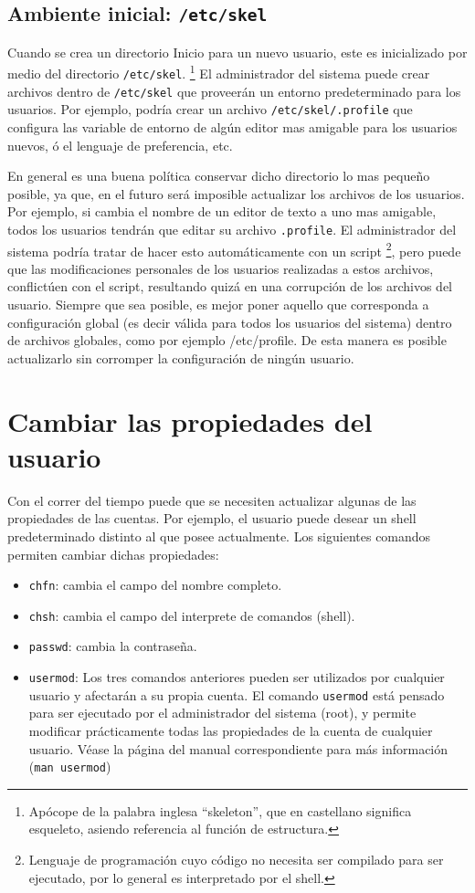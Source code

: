 \documentclass[12pt]{article}
\begin{document}
\subsection*{Ambiente inicial: \texttt{/etc/skel}}
Cuando se crea un directorio Inicio para un nuevo usuario, este es
inicializado por medio del directorio \texttt{/etc/skel}. 
\footnote{Apócope de la palabra inglesa ``skeleton'', que en castellano 
significa esqueleto, asiendo referencia al función de estructura.} El
administrador del sistema puede crear archivos dentro de
\texttt{/etc/skel} que proveerán un entorno predeterminado
para los usuarios. Por ejemplo, podría crear un archivo 
\texttt{/etc/skel/.profile} que configura las variable de entorno
de algún editor mas amigable para los usuarios nuevos, ó el lenguaje 
de preferencia, etc. 

En general es una buena política conservar dicho directorio lo mas pequeño
posible, ya que, en el futuro será imposible actualizar los archivos de
los usuarios. Por ejemplo, si cambia el nombre de un editor de texto a uno mas amigable,
todos los usuarios tendrán que editar su archivo  \texttt{.profile}.
El administrador del sistema podría tratar de hacer esto automáticamente con un
script \footnote{Lenguaje de programación cuyo código no necesita ser
compilado para ser ejecutado, por lo general es interpretado por el shell.}, pero
puede que las modificaciones personales de los usuarios realizadas a estos 
archivos, conflictúen con el script, resultando quizá en una corrupción de 
los archivos del usuario. Siempre que sea posible, es mejor poner aquello que 
corresponda a configuración global (es decir válida para todos los usuarios del sistema)
dentro de archivos globales, como por ejemplo /etc/profile. De esta manera es posible
actualizarlo sin corromper la configuración de ningún usuario.  


\section*{Cambiar las propiedades del usuario}
Con el correr del tiempo puede que se necesiten actualizar algunas de las 
propiedades de las cuentas. Por ejemplo, el usuario puede desear un shell 
predeterminado distinto al que posee actualmente. Los siguientes comandos 
permiten cambiar dichas propiedades: 

\begin{itemize}
\item 	\texttt{chfn}: cambia el campo del nombre completo.
\item 	\texttt{chsh}:  cambia el campo del interprete de comandos (shell).
\item 	\texttt{passwd}: cambia la contraseña. 
\item 	\texttt{usermod}: Los tres comandos anteriores pueden ser utilizados 
por cualquier usuario y afectarán a su propia cuenta. El comando \texttt{usermod}
está pensado para ser ejecutado por el administrador del sistema (root), y 
permite modificar prácticamente todas las propiedades de la cuenta de cualquier 
usuario. Véase la página del manual correspondiente para más información
(\texttt{man usermod})
\end{itemize}
\end{document}
